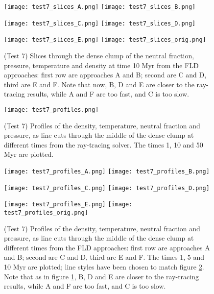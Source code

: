 \documentclass[letterpaper,11pt]{article}
\begin{document}
\begin{figure}[t]
  \centerline{
  \texttt{[image: test7\_slices\_A.png]}
  \texttt{[image: test7\_slices\_B.png]}
  }
  \centerline{
  \texttt{[image: test7\_slices\_C.png]}
  \texttt{[image: test7\_slices\_D.png]}
  }
  \centerline{
  \texttt{[image: test7\_slices\_E.png]}
  \texttt{[image: test7\_slices\_orig.png]}
  }
  \caption{(Test 7) Slices through the dense clump of the neutral
    fraction, pressure, temperature and density at time 10 Myr from
    the FLD approaches: first row are approaches A and B; second are C
    and D, third are E and F. Note that now, B, D and E are closer to
    the ray-tracing results, while A and F are too fast, and C is too slow.} 
  \label{fig:test7_slices}
\end{figure}



\begin{figure}[t]
  \centerline{
  \texttt{[image: test7\_profiles.png]}
  }
  \caption{(Test 7) Profiles of the density, temperature, neutral
    fraction and pressure, as line cuts through the middle of the
    dense clump at different times from the ray-tracing solver.  The
    times 1, 10 and 50 Myr are plotted.} 
  \label{fig:test7_profiles_RT}
\end{figure}

\begin{figure}[t]
  \centerline{
  \texttt{[image: test7\_profiles\_A.png]}
  \texttt{[image: test7\_profiles\_B.png]}
  }
  \centerline{
  \texttt{[image: test7\_profiles\_C.png]}
  \texttt{[image: test7\_profiles\_D.png]}
  }
  \centerline{
  \texttt{[image: test7\_profiles\_E.png]}
  \texttt{[image: test7\_profiles\_orig.png]}
  }
  \caption{(Test 7) Profiles of the density, temperature, neutral
    fraction and pressure, as line cuts through the middle of the
    dense clump at different times from the FLD approaches: first row
    are approaches A and B; second are C and D, third are E and F.
    The times 1, 5 and 10 Myr are plotted; line styles have been
    chosen to match figure \ref{fig:test7_profiles_RT}.  Note that as
    in figure \ref{fig:test7_slices}, B, D and E are closer to
    the ray-tracing results, while A and F are too fast, and C is too slow.} 
  \label{fig:test7_profiles}
\end{figure}
\end{document}
